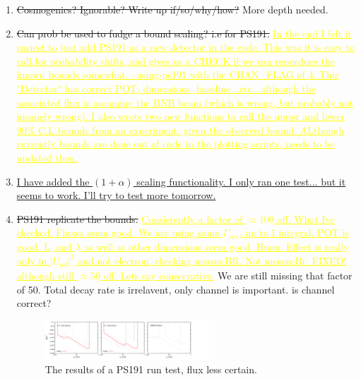 \documentclass[11pt, a4paper]{article}
\newcommand{\newtext}[2]{\textcolor{#1}{\ul{#2}}}
\begin{document}
\begin{enumerate}
\item \sout{Cosmogenics? Ignorable? Write up if/so/why/how?} More depth needed.

\item \sout{Can prob be used to fudge a bound scaling? i.e for PS191.}
\newtext{MARK}{In the end I felt it easiest to just add PS191 as a new detector
in the code. This was it is easy to call for probability shifts, and gives us a
CHECK if we can reporduce the known bounds somewhat.  --using-ps191 with the
CHAN\_FLAG of 4.  This "Detector" has correct POT, dimensions, baseline ..etc..
although the associated flux is assuming the BNB beam (which is wrong, but
probably not insanely wrong). I also wrote two new functions to call the upper
and lower 90\% C.L bounds from an experiment, given the observed bound.
ALthough currently bounds are done out of code in the plotting scripts, needs
to be updated then. }

\item \newtext{PB}{I have added the $(1+\alpha)$ scaling functionality. I only
ran one test... but it seems to work. I'll try to test more tomorrow.} 

\item \sout{PS191 replicate the bounds.} \newtext{MARK}{Consistently a factor of $\approx 100$ off. What Ive checked. Fluxes seem good. We are using same $\Gamma_{\nu ee}$, up to I integral. POT is good. L, and $\lambda$ as well as other dimensions seem good. Hmm. Effect is really only in $\vert U_{\mu 4}\vert^2$ and not electron, checking meson-BR. Not meson-Br. FIXED! although still $\approx 50$ off. Lets say conservative.} 
	We are still missing that factor of 50. Total decay rate is irrelavent, only channel is important. is channel correct?
\begin{figure}[t]
\center
\includegraphics[width=0.6\textwidth]{figures/zerobg_um4_ps191_test.pdf}
\caption{The results of a PS191 run test, flux less certain.}
\end{figure}


\end{enumerate}



{}
\end{document}
